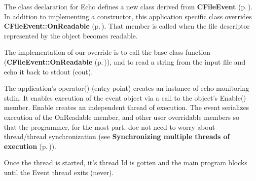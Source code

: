 The class declaration for Echo defines a new class derived from {\bf CFile\-Event} {\rm (p.\,\pageref{classCFileEvent})}. In addition to implementing a constructor, this application specific class overrides {\bf CFile\-Event::On\-Readable} {\rm (p.\,\pageref{classCFileEvent_a15})}. That member is called when the file descriptor represented by the object becomes readable.

The implementation of our override is to call the base class function ({\bf CFile\-Event::On\-Readable} {\rm (p.\,\pageref{classCFileEvent_a15})}), and to read a string from the input file and echo it back to stdout (cout).

The application's operator() (entry point) creates an instance of echo monitoring stdin. It enables execution of the event object via a call to the object's Enable() member. Enable creates an independent thread of execution. The event serializes execution of the On\-Readable member, and other user overridable members so that the programmer, for the most part, doe not need to worry about thread/thread synchronization (see {\bf Synchronizing multiple threads of execution} {\rm (p.\,\pageref{Synchronization})}).

Once the thread is started, it's thread Id is gotten and the main program  blocks until the Event thread exits (never).

